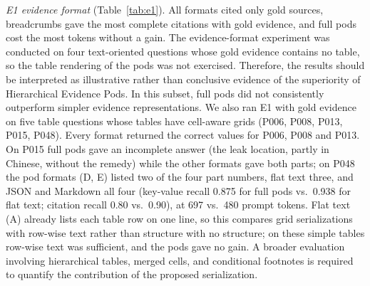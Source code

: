 \documentclass[runningheads]{llncs}
\begin{document}
\emph{E1 evidence format} (Table~\ref{tab:e1}). All formats cited only gold sources, breadcrumbs gave the most complete citations with gold evidence, and full pods cost the most tokens without a gain. The evidence-format experiment was conducted on four text-oriented questions whose gold evidence contains no table, so the table rendering of the pods was not exercised. Therefore, the results should be interpreted as illustrative rather than conclusive evidence of the superiority of Hierarchical Evidence Pods. In this subset, full pods did not consistently outperform simpler evidence representations. We also ran E1 with gold evidence on five table questions whose tables have cell-aware grids (P006, P008, P013, P015, P048). Every format returned the correct values for P006, P008 and P013. On P015 full pods gave an incomplete answer (the leak location, partly in Chinese, without the remedy) while the other formats gave both parts; on P048 the pod formats (D, E) listed two of the four part numbers, flat text three, and JSON and Markdown all four (key-value recall 0.875 for full pods vs.\ 0.938 for flat text; citation recall 0.80 vs.\ 0.90), at 697 vs.\ 480 prompt tokens. Flat text (A) already lists each table row on one line, so this compares grid serializations with row-wise text rather than structure with no structure; on these simple tables row-wise text was sufficient, and the pods gave no gain. A broader evaluation involving hierarchical tables, merged cells, and conditional footnotes is required to quantify the contribution of the proposed serialization.
\end{document}
